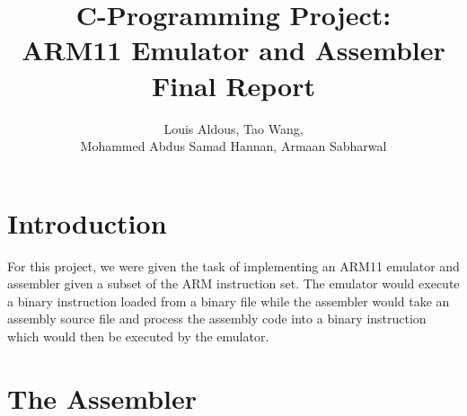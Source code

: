 \documentclass[11pt]{article}
\begin{document}
\title{C-Programming Project: \\ARM11 Emulator and Assembler \\ \textbf{Final Report}}
\author{Louis Aldous, Tao Wang, \\Mohammed Abdus Samad Hannan, Armaan Sabharwal}

\maketitle

\section{Introduction}

For this project, we were given the task of implementing an ARM11 emulator and assembler given a subset of the ARM instruction set. The emulator would execute a binary instruction loaded from a binary file while the assembler would take an assembly source file and process the assembly code into a binary instruction which would then be executed by the emulator. %

\section{The Assembler}
\end{document}
